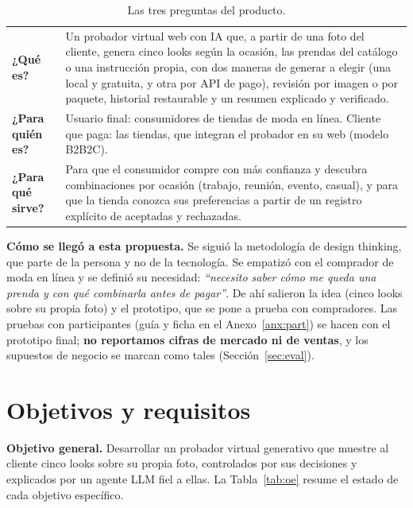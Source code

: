 \documentclass[11pt,letterpaper]{article}
\begin{document}
\begin{table}[H]
\centering
\caption{Las tres preguntas del producto.}
\small
\begin{tabularx}{\textwidth}{@{}p{2.6cm}L@{}}
\toprule
\textbf{¿Qué es?} & Un probador virtual web con IA que, a partir de una foto del cliente, genera cinco looks según la
ocasión, las prendas del catálogo o una instrucción propia, con dos maneras de generar a elegir (una local y gratuita, y
otra por API de pago), revisión por imagen o por paquete, historial restaurable y un resumen explicado y verificado. \\
\textbf{¿Para quién es?} & Usuario final: consumidores de tiendas de moda en línea. Cliente que paga: las tiendas, que
integran el probador en su web (modelo B2B2C). \\
\textbf{¿Para qué sirve?} & Para que el consumidor compre con más confianza y descubra combinaciones por ocasión
(trabajo, reunión, evento, casual), y para que la tienda conozca sus preferencias a partir de un registro explícito de
aceptadas y rechazadas. \\
\bottomrule
\end{tabularx}
\end{table}

\textbf{Cómo se llegó a esta propuesta.} Se siguió la metodología de design thinking, que parte de la persona y no de la
tecnología. Se empatizó con el comprador de moda en línea y se definió su necesidad: \emph{``necesito saber cómo me queda
una prenda y con qué combinarla antes de pagar''}. De ahí salieron la idea (cinco looks sobre su propia foto) y el
prototipo, que se pone a prueba con compradores. Las pruebas con participantes (guía y ficha en el
Anexo~\ref{anx:part}) se hacen con el prototipo final; \textbf{no reportamos cifras de mercado ni de ventas}, y los
supuestos de negocio se marcan como tales (Sección~\ref{sec:eval}).

\section{Objetivos y requisitos}

\textbf{Objetivo general.} Desarrollar un probador virtual generativo que muestre al cliente cinco looks sobre su
propia foto, controlados por sus decisiones y explicados por un agente LLM fiel a ellas. La Tabla~\ref{tab:oe} resume
el estado de cada objetivo específico.
\end{document}
